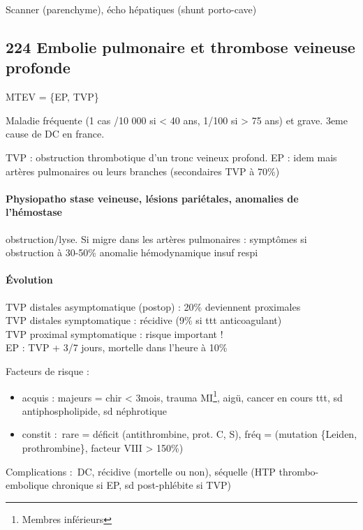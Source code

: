 \documentclass[11pt]{article}
\begin{document}
Scanner (parenchyme), écho hépatiques (shunt porto-cave)


\subsection{224 \textdagger{} Embolie pulmonaire et thrombose veineuse profonde}
\label{sec:org4da80b3}
\label{sec:224_embolie_pulmonaire_et_thrombose_veineuse_profonde}
\gls{MTEV} = \{\gls{EP}, \gls{TVP}\}

Maladie fréquente (1 cas /10 000 si < 40 ans, 1/100 si > 75 ans) et grave.
3eme cause de DC en france.

TVP : obstruction thrombotique d'un tronc veineux profond. EP : idem mais
artères pulmonaires ou leurs branches (secondaires TVP à 70\%)

\paragraph{Physiopatho stase veineuse, lésions pariétales, anomalies de l'hémostase \thus}
\label{sec:org9ec3131}
obstruction/lyse. Si migre dans les artères pulmonaires : symptômes si
obstruction à 30-50\% \thus anomalie hémodynamique \thus insuf respi

\paragraph{Évolution}
\label{sec:org11dd021}
TVP distales asymptomatique (postop) : 20\% deviennent proximales\\
TVP distales symptomatique : récidive (9\% si ttt anticoagulant)\\
TVP proximal symptomatique : risque important !\\
EP : TVP + 3/7 jours, mortelle dans l'heure à 10\%

Facteurs de risque :

\begin{itemize}
\item acquis : majeurs = chir < 3mois, trauma MI\footnote{Membres inférieurs},
\faHospitalO{} aigü, cancer en cours  ttt, sd antiphospholipide, sd
néphrotique
\item constit : rare = déficit (antithrombine, prot. C, S), fréq = (mutation \{Leiden,
prothrombine\}, facteur VIII > 150\%)
\end{itemize}

Complications : DC, récidive (mortelle ou non), séquelle (HTP thrombo-embolique
chronique si EP, sd post-phlébite si TVP)
\end{document}
